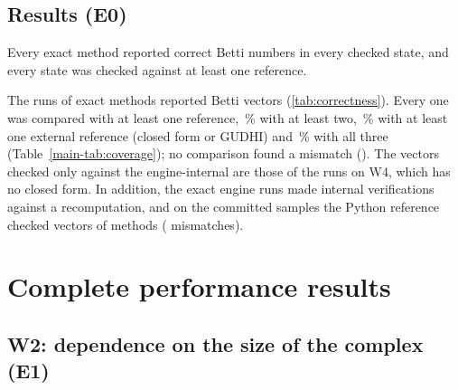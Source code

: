 

\subsection{Results (E0)}\label{sec:e0}


Every exact method reported correct Betti numbers in every checked state, and
every state was checked against at least one reference.

The \NumExactRuns{} runs of exact methods reported \NumCoverageVectors{} Betti
vectors (\cref{tab:correctness}). Every one was compared with at least one
reference, \NumCoverageGeTwoPct\,\% with at least two,
\NumCoverageExternalPct\,\% with at least one external reference (closed form or
GUDHI) and \NumCoverageAllThreePct\,\% with all three (Table~\ref{main-tab:coverage}); no
comparison found a mismatch (\NumExactMismatches). The
\NumCoverageEngineOnly{} vectors checked only against the engine-internal
 are those of the  runs on W4, which has no closed
form. In addition, the exact engine runs made \NumInternalChecks{} internal
verifications against a recomputation, and on the
\NumReferenceSamples{} committed samples the Python reference checked
\NumReferenceChecks{} vectors of \NumReferenceMethods{} methods
(\NumReferenceMismatches{} mismatches).

\begin{table}[tbp]
  \centering
  \caption{Correctness (E0): per exact method, the runs, the Betti vectors they
    reported, the states compared with the  output of the same
    instance, with the closed-form values and with GUDHI, and the mismatches
    ( ran on four instances only).}
  \label{tab:correctness}
  \small
\end{table}

\section{Complete performance results}\label{sec:s-results}

\subsection{W2: dependence on the size of the complex (E1)}\label{sec:e1}


